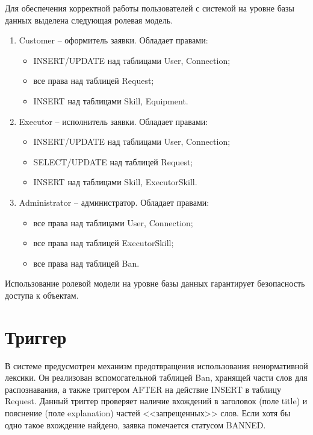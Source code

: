 Для обеспечения корректной работы пользователей с системой на уровне базы данных выделена следующая ролевая модель.
\begin{enumerate}
	\item Customer -- оформитель заявки. Обладает правами:
	\begin{itemize}
		\item INSERT/UPDATE над таблицами User, Connection;
		\item все права над таблицей Request;
		\item INSERT над таблицами Skill, Equipment.
	\end{itemize}
	\item Executor -- исполнитель заявки. Обладает правами:
	\begin{itemize}
		\item INSERT/UPDATE над таблицами User, Connection;
		\item SELECT/UPDATE над таблицей Request;
		\item INSERT над таблицами Skill, ExecutorSkill.
	\end{itemize}
	\item Administrator -- администратор. Обладает правами:
	\begin{itemize}
		\item все права над таблицами User, Connection;
		\item все права над таблицей ExecutorSkill;
		\item все права над таблицей Ban.
	\end{itemize}
\end{enumerate}
Использование ролевой модели на уровне базы данных гарантирует безопасность доступа к объектам.


\section{Триггер}

В системе предусмотрен механизм предотвращения использования ненормативной лексики. Он реализован вспомогательной таблицей Ban, хранящей части слов для распознавания,  а также триггером AFTER на действие INSERT в таблицу Request. Данный триггер проверяет наличие вхождений в заголовок (поле title) и пояснение (поле explanation) частей <<запрещенных>> слов. Если хотя бы одно такое вхождение найдено, заявка помечается статусом BANNED.

